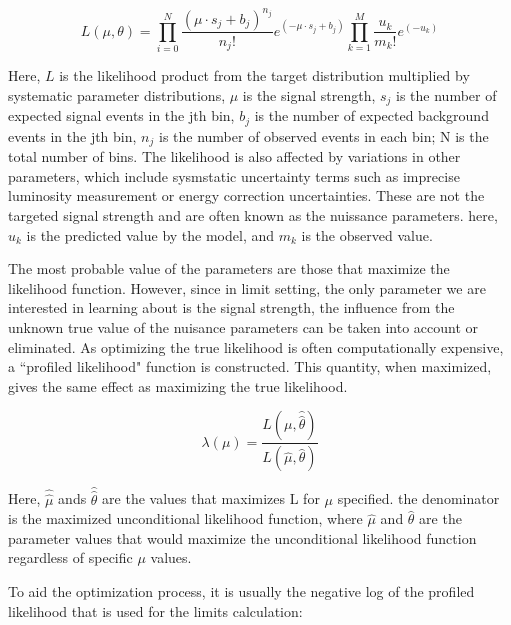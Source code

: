 \begin{equation}
    L(\mu, \theta) =  \prod_{i=0}^{N} \frac{(\mu \cdot s_{j} + b_{j})^{n_j}}{n_{j}!}e^{(-\mu \cdot s_j + b_j)} \prod_{k=1}^{M}\frac{u_{k}}
{m_{k}!} e^{(-u_{k})}
\label{eq:likelihood}
\end{equation}

Here, $L$ is the likelihood product from the target distribution multiplied by systematic parameter distributions, $\mu$ is the signal strength, $s_j$ is the number of expected signal events in the jth bin, $b_j$ is the number of expected background events in the jth  bin, $n_j$ is the number of observed events in each bin; N is the total number of bins. The likelihood is also affected by variations in other parameters, which include sysmstatic uncertainty terms such as imprecise luminosity measurement or energy correction uncertainties. These are not the targeted signal strength and are often known as the nuissance parameters. here, $u_k$ is the predicted value by the model, and $m_{k}$ is the observed value. 


The most probable value of the parameters are those that maximize the likelihood function. However, since in limit setting, the only parameter we are interested in learning about is the signal strength, the influence from the unknown true value of the nuisance parameters can be taken into account or eliminated. As optimizing the true likelihood is often computationally expensive, a ``profiled likelihood" function is constructed. This quantity, when maximized, gives the same effect as maximizing the true likelihood. 

\begin{equation}
\lambda(\mu) = \frac{L(\mu, \hat{\hat{\theta}})}{L(\hat{\mu}, \hat{\theta})}
\label{eq:profilelikelihood}
\end{equation}

Here, $\hat{\hat{\mu}}$ ands $\hat{\hat{\theta}}$ are the values that maximizes L for $\mu$ specified. the denominator is the maximized unconditional likelihood function, where $\hat{\mu}$ and $\hat{\theta}$ are the parameter values that would maximize the unconditional likelihood function regardless of specific $\mu$ values.

To aid the optimization process, it is usually the negative log of the profiled likelihood that is used for the limits calculation:

